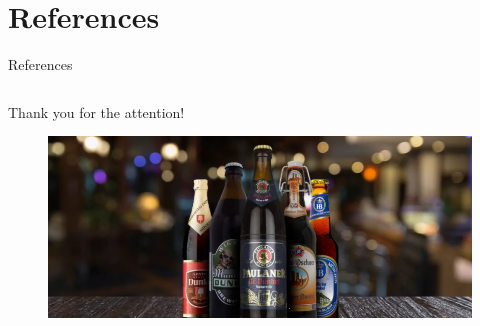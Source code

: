 \documentclass[aspectratio=43]{beamer}
\begin{document}
\section{References}
\begin{frame}{References}
   \begin{columns}
      \begin{column}{0.9\textwidth}

         \printbibliography[heading=none]
      \end{column}
   \end{columns}

\end{frame}


\begin{frame}{Thank you for the attention!}
   \begin{figure}[H]
     \centering
     \includegraphics[width=0.9\linewidth]{pics/german_beer.png}
   \end{figure}
\end{frame}
\end{document}
